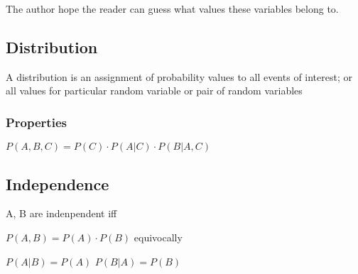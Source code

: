     The author hope the reader can guess what values these variables belong
    to.

  \subsection{}

  \subsection{Distribution}

    A distribution is an assignment of probability values to
    all events of interest; or all values for particular random variable or
    pair of random variables

    \subsubsection{Properties}

    $ P(A, B, C) = P(C) \cdot P(A | C) \cdot P(B | A, C) $

    \subsection{Independence}

      A, B are indenpendent iff

      $ P(A, B) = P(A) \cdot P(B) $ equivocally

      $ P(A|B) = P(A) $
      $ P(B|A) = P(B) $